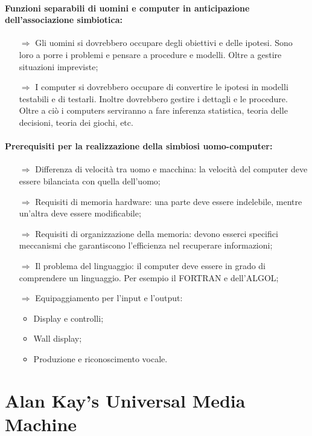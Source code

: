 \paragraph{Funzioni separabili di uomini e computer in anticipazione dell'associazione
simbiotica:} 

\begin{itemize}
    \item [$\Rightarrow$] Gli uomini si dovrebbero occupare degli obiettivi e delle ipotesi.
    Sono loro a porre i problemi e pensare a procedure e modelli. Oltre a gestire situazioni impreviste;
    \item [$\Rightarrow$] I computer si dovrebbero occupare di convertire le ipotesi in modelli 
    testabili e di testarli. Inoltre dovrebbero gestire i dettagli e le procedure. Oltre a ciò 
    i computers serviranno a fare inferenza statistica, teoria delle decisioni, teoria dei giochi, etc.
\end{itemize}

\paragraph{Prerequisiti per la realizzazione della simbiosi uomo-computer:}

\begin{itemize}
    \item [$\Rightarrow$] Differenza di velocità tra uomo e macchina: la velocità del computer 
    deve essere bilanciata con quella dell'uomo;
    \item [$\Rightarrow$] Requisiti di memoria hardware: una parte deve essere indelebile, mentre
    un'altra deve essere modificabile;
    \item [$\Rightarrow$] Requisiti di organizzazione della memoria: devono esserci specifici meccanismi
    che garantiscono l'efficienza nel recuperare informazioni;
    \item [$\Rightarrow$] Il problema del linguaggio: il computer deve essere in grado di comprendere
    un linguaggio. Per esempio il FORTRAN e dell'ALGOL;
    \item [$\Rightarrow$] Equipaggiamento per l'input e l'output:
    \begin{itemize}
        \item Display e controlli;
        \item Wall display;
        \item Produzione e riconoscimento vocale.
    \end{itemize}
\end{itemize}

\section{Alan Kay's Universal Media Machine}









